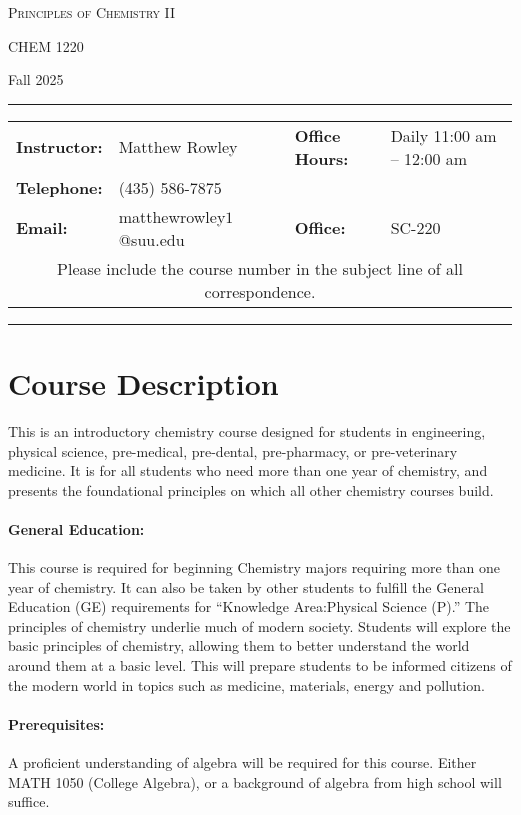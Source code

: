 \documentclass[12pt, letterpaper]{article}
\begin{document}
\begin{center}
	{\Large \textsc{Principles of Chemistry II}}

	CHEM 1220
\end{center}

\begin{center}
	{\large Fall 2025}
\end{center}
\begin{center}
	\rule{0.99\textwidth}{0.4pt}
	\begin{tabular}{llcll}
		\textbf{Instructor:} & Matthew Rowley           &  & \textbf{Office Hours:} & Daily 11:00 am -- 12:00 am \\
		\textbf{Telephone:}  & (435) 586-7875           &  &                        &  \\
		\textbf{Email:}      & matthewrowley$1$@suu.edu &  & \textbf{Office:}       & SC-220                   \\
		\multicolumn{5}{c}{Please include the course number in the subject line of all correspondence.}
	\end{tabular}
	\rule{0.99\textwidth}{0.4pt}
\end{center}

\section*{Course Description}
This is an introductory chemistry course designed for students in engineering, physical science, pre-medical, pre-dental, pre-pharmacy, or pre-veterinary medicine. It is for all students who need more than one year of chemistry, and presents the foundational principles on which all other chemistry courses build.

\paragraph{General Education:}
This course is required for beginning Chemistry majors requiring more than one year of chemistry. It can also be taken by other students to fulfill the General Education (GE) requirements for ``Knowledge Area:Physical Science (P).'' The principles of chemistry underlie much of modern society. Students will explore the basic principles of chemistry, allowing them to better understand the world around them at a basic level. This will prepare students to be informed citizens of the modern world in topics such as medicine, materials, energy and pollution.

\paragraph{Prerequisites:}
A proficient understanding of algebra will be required for this course. Either MATH 1050 (College Algebra), or a background of algebra from high school will suffice.
\end{document}
